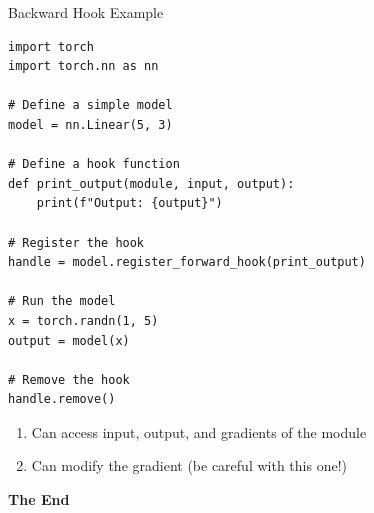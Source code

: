 \documentclass[aspectratio=169,xcolor=dvipsnames,svgnames,x11names,fleqn]{beamer}
\begin{document}
\begin{frame}[fragile]{Backward Hook Example}
          \begin{verbatim}
import torch
import torch.nn as nn

# Define a simple model
model = nn.Linear(5, 3)

# Define a hook function
def print_output(module, input, output):
    print(f"Output: {output}")

# Register the hook
handle = model.register_forward_hook(print_output)

# Run the model
x = torch.randn(1, 5)
output = model(x)

# Remove the hook
handle.remove()
\end{verbatim}

\begin{enumerate}
\item Can access input, output, and gradients of the module
\item Can modify the gradient (be careful with this one!)
\end{enumerate}
\end{frame}


    \begin{frame}
        \Huge{\centerline{\color{MediumBlue}\textbf{The End}}}
    \end{frame}
\end{document}
